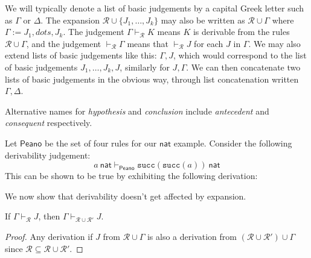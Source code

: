 \begin{remark}
    We will typically denote a list of basic judgements by a capital Greek letter such as $\Gamma$ or $\Delta$. The expansion $\mathcal{R} \cup \{ J_1, \dots, J_k \}$ may also be written as $\mathcal{R} \cup \Gamma$ where $\Gamma := J_1, dots, J_k$. The judgement $\Gamma \vdash_{\mathcal{R}} K$ means $K$ is derivable from the rules $\mathcal{R} \cup \Gamma$, and the judgement $\vdash _{\mathcal{R}} \Gamma$ means that $\vdash _{\mathcal{R}} J$ for each $J$ in $\Gamma$. We may also extend lists of basic judgements like this: $\Gamma, J$, which would correspond to the list of basic judgements $J_1, \dots, J_k, J$, similarly for $J, \Gamma$. We can then concatenate two lists of basic judgements in the obvious way, through list concatenation written $\Gamma, \Delta$.
\end{remark}

\begin{remark}
    Alternative names for \emph{hypothesis} and \emph{conclusion} include \emph{antecedent} and \emph{consequent} respectively.
\end{remark}

\begin{example}
    Let $\mathsf{Peano}$ be the set of four rules for our $\mathsf{nat}$ example. Consider the following derivability judgement:
    $$a\ \mathsf{nat} \vdash_{\mathsf{Peano}} \texttt{succ}(\texttt{succ}(a))\ \mathsf{nat}$$
    This can be shown to be true by exhibiting the following derivation:
    \begin{prooftree}
    \end{prooftree}
\end{example}

We now show that derivability doesn't get affected by expansion.

\begin{lemma}[Stability]
    If $\Gamma \vdash_{\mathcal{R}} J$, then $\Gamma \vdash_{\mathcal{R} \cup \mathcal{R'}} J$.
\end{lemma}

\begin{proof}
    Any derivation if $J$ from $\mathcal{R} \cup \Gamma$ is also a derivation from $(\mathcal{R} \cup \mathcal{R}') \cup \Gamma$ since $\mathcal{R} \subseteq \mathcal{R}\cup \mathcal{R}'$.
\end{proof}

